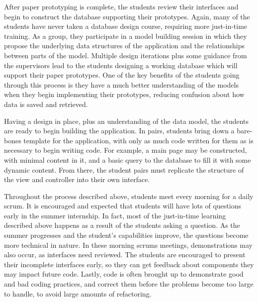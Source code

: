 After paper prototyping is complete, the students review their interfaces and begin to construct the database supporting their prototypes. Again, many of the students have never taken a database design course, requiring more just-in-time training. As a group, they participate in a model building session in which they propose the underlying data structures of the application and the relationships between parts of the model. Multiple design iterations plus some guidance from the supervisors lead to the students designing a working database which will support their paper prototypes. One of the key benefits of the students going through this process is they have a much better understanding of the models when they begin implementing their prototypes, reducing confusion about how data is saved and retrieved. 

Having a design in place, plus an understanding of the data model, the students are ready to begin building the application. In pairs, students bring down a bare-bones template for the application, with only as much code written for them as is necessary to begin writing code. For example, a main page may be constructed, with minimal content in it, and a basic query to the database to fill it with some dynamic content. From there, the student pairs must replicate the structure of the view and controller into their own interface.

Throughout the process described above, students meet every morning for a daily scrum. It is encouraged and expected that students will have lots of questions early in the summer internship. In fact, most of the just-in-time learning described above happens as a result of the students asking a question. As the summer progresses and the student's capabilities improve, the questions become more technical in nature. In these morning scrums meetings, demonstrations may also occur, as interfaces need reviewed. The students are encouraged to present their incomplete interfaces early, so they can get feedback about components they may impact future code. Lastly, code is often brought up to demonstrate good and bad coding practices, and correct them before the problems become too large to handle, to avoid large amounts of refactoring. 

